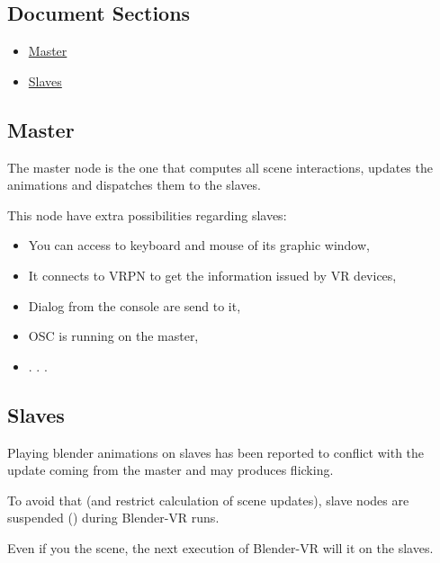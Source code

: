 \documentclass[a4,10pt,openany,oneside]{sphinxmanual}
\begin{document}
\subsection{Document Sections}
\label{architecture/master-slaves:document-sections}\begin{itemize}
\item {} 
{\hyperref[architecture/master-slaves:master]{Master}}

\item {} 
{\hyperref[architecture/master-slaves:slaves]{Slaves}}

\end{itemize}


\subsection{Master}
\label{architecture/master-slaves:master}
The master node is the one that computes all scene interactions, updates the animations and dispatches them to the slaves.

This node have extra possibilities regarding slaves:
\begin{itemize}
\item {} 
You can access to keyboard and mouse of its graphic window,

\item {} 
It connects to VRPN to get the information issued by VR devices,

\item {} 
Dialog from the console are send to it,

\item {} 
OSC is running on the master,

\item {} 
. . .

\end{itemize}


\subsection{Slaves}
\label{architecture/master-slaves:slaves}
Playing blender animations on slaves has been reported to conflict with the update
coming from the master and may produces flicking.

To avoid that (and restrict calculation of scene updates), slave nodes are suspended () during Blender-VR runs.

Even if you  the scene, the next execution of Blender-VR will  it on the slaves.
\end{document}
